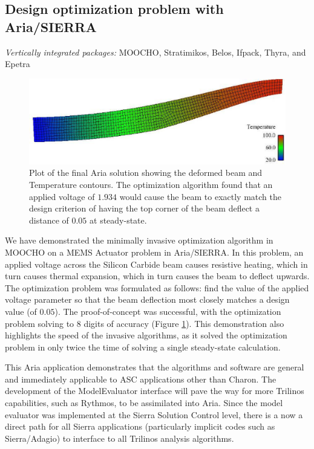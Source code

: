 \documentclass[pdf,ps2pdf,11pt]{SANDreport}
\begin{document}
%
\subsection{Design optimization problem with Aria/SIERRA}
%

{}\noindent\textit{Vertically integrated packages:} MOOCHO, Stratimikos,
Belos, Ifpack, Thyra, and Epetra

{\bsinglespace
\begin{figure}
\begin{center}
\includegraphics*[angle=0,scale=0.50
]{SiC_dY0.1.eps}
\end{center}
\caption[Final optimization solution for Aria MEMS actuator design problem]{
\label{fig:ariaFinal}
Plot of the final Aria solution showing the deformed beam and Temperature
contours. The optimization algorithm found that an applied voltage of $1.934$
would cause the beam to exactly match the design criterion of having the top
corner of the beam deflect a distance of $0.05$ at steady-state.  }
\end{figure}
\esinglespace}

We have demonstrated the minimally invasive optimization algorithm in MOOCHO
on a MEMS Actuator problem in Aria/SIERRA.  In this problem, an applied
voltage across the Silicon Carbide beam causes resistive heating, which in
turn causes thermal expansion, which in turn causes the beam to deflect
upwards. The optimization problem was formulated as follows: find the value of
the applied voltage parameter so that the beam deflection most closely matches
a design value (of $0.05$). The proof-of-concept was successful, with the
optimization problem solving to $8$ digits of accuracy (Figure
{}\ref{fig:ariaFinal}). This demonstration also highlights the speed of the
invasive algorithms, as it solved the optimization problem in only twice the
time of solving a single steady-state calculation.

This Aria application demonstrates that the algorithms and software are
general and immediately applicable to ASC applications other than Charon. The
development of the ModelEvaluator interface will pave the way for more
Trilinos capabilities, such as Rythmos, to be assimilated into Aria. Since the
model evaluator was implemented at the Sierra Solution Control level, there is
a now a direct path for all Sierra applications (particularly implicit codes
such as Sierra/Adagio) to interface to all Trilinos analysis algorithms.
\end{document}
